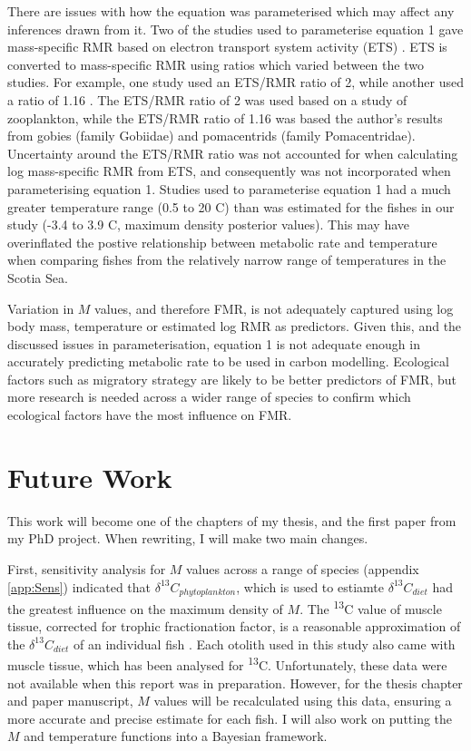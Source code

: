 \documentclass[12pt, titlepage]{article}
\begin{document}
There are issues with how the equation was parameterised which may affect any inferences drawn from it.
Two of the studies used to parameterise equation 1 gave mass-specific RMR based on electron transport system activity (ETS) \citep{Belcher2019}.
ETS is converted to mass-specific RMR using ratios which varied between the two studies.
For example, one study used an ETS/RMR ratio of 2,\citep{Ariza2015}
while another used a ratio of 1.16 \citep{Ikeda1989}.
The ETS/RMR ratio of 2 was used based on a study of zooplankton, \citep{herna1996factors}
while the ETS/RMR ratio of 1.16 was based the author's results from gobies (family Gobiidae) and pomacentrids (family Pomacentridae).
Uncertainty around the ETS/RMR ratio was not accounted for when calculating log mass-specific RMR from ETS, and consequently was not incorporated when parameterising equation 1.
Studies used to parameterise equation 1 had a much greater temperature range (0.5 to 20 \textdegree C) than was estimated for the fishes in our study (-3.4 to 3.9 \textdegree C, maximum density posterior values).
This may have overinflated the postive relationship between metabolic rate and temperature when comparing fishes from the relatively narrow range of temperatures in the Scotia Sea.

Variation in $M$ values, and therefore FMR, is not adequately captured using log body mass, temperature or estimated log RMR as predictors.
Given this, and the discussed issues in parameterisation, equation 1 is not adequate enough in accurately predicting metabolic rate to be used in carbon modelling.
Ecological factors such as migratory strategy are likely to be better predictors of FMR, but more research is needed across a wider range of species to confirm which ecological factors have the most influence on FMR.

\pagebreak
\section{Future Work}
\label{sec:future}

This work will become one of the chapters of my thesis, and the first paper from my PhD project.
When rewriting, I will make two main changes.

First, sensitivity analysis for $M$ values across a range of species (appendix \ref{app:Sens}) indicated that $\delta^{13}C_{phytoplankton}$, which is used to estiamte $\delta^{13}C_{diet}$ had the greatest influence on the maximum density of $M$. 
The \textdelta \textsuperscript{13}C value of muscle tissue, corrected for trophic fractionation factor, is a reasonable approximation of the $\delta^{13}C_{diet}$ of an individual fish \citep{DeNiro1978}.
Each otolith used in this study also came with muscle tissue, which has been analysed for \textdelta \textsuperscript{13}C.
Unfortunately, these data were not available when this report was in preparation.
However, for the thesis chapter and paper manuscript, $M$ values will be recalculated using this data, ensuring a more accurate and precise estimate for each fish.
I will also work on putting the $M$ and temperature functions into a Bayesian framework.
\end{document}
